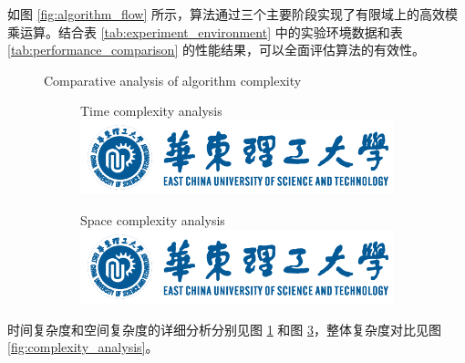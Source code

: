 如图 \ref{fig:algorithm_flow} 所示，算法通过三个主要阶段实现了有限域上的高效模乘运算。结合表 \ref{tab:experiment_environment} 中的实验环境数据和表 \ref{tab:performance_comparison} 的性能结果，可以全面评估算法的有效性。

\begin{figure}[H] %
	\centering
	{Comparative analysis of algorithm complexity} %
	\label{fig:complexity_analysis} %
	
	\begin{subfigure}{0.45\textwidth} %
		\centering
		{Time complexity analysis} %
		\label{fig:time_complexity} %
		\includegraphics[width=0.85\linewidth]{figures/ECUST-logo.png}
	\end{subfigure}%
	\hfill %
	\begin{subfigure}{0.45\textwidth}
		\centering
		{Space complexity analysis} %
		\label{fig:space_complexity} %
		\includegraphics[width=0.85\linewidth]{figures/ECUST-logo.png}
	\end{subfigure}

\end{figure}



时间复杂度和空间复杂度的详细分析分别见图 \ref{fig:time_complexity} 和图 \ref{fig:space_complexity}，整体复杂度对比见图 \ref{fig:complexity_analysis}。
